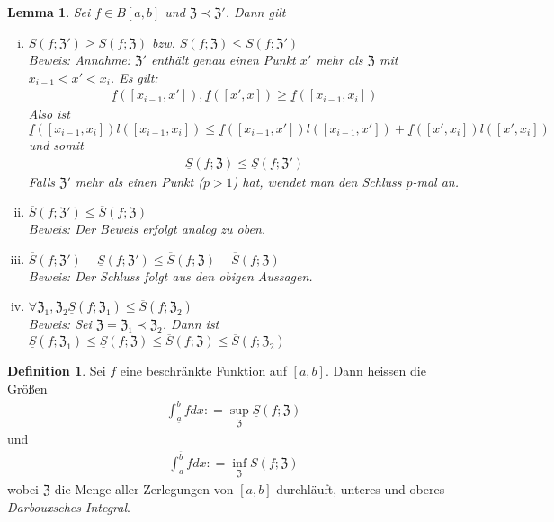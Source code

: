 \documentclass[ngerman,titlepage,twoside, parskip=half*]{scrreprt}
\newcommand*{\ZZ}{\mathfrak{Z}}
\theoremstyle{plain}
\newtheorem{lemma}{Lemma}
\theoremstyle{definition}
\newtheorem{definition}{Definition}
\theoremstyle{remark}
\newcommand*{\coloneqq}{\mathrel{\mathop:}=}
\begin{document}
\begin{lemma}
  \label{lemma:int}
  Sei $f\in B[a,b]$ und $\ZZ\prec \ZZ'$. Dann gilt
  \begin{enumerate}[(i)]
    \item $\underline{S}(f;\ZZ')\geq \underline{S}(f;\ZZ)$
      bzw. $\underline{S}(f;\ZZ) \leq \underline{S}(f; \ZZ')$\\
      \textit{Beweis}: Annahme: $\ZZ'$ enthält genau einen Punkt $x'$ mehr
      als $\ZZ$ mit $x_{i-1}<x'<x_i$. Es gilt:
      \begin{gather*}\underline{f}([x_{i-1},x']),\underline{f}([x',x])\geq \underline{f}
      ([x_{i-1},x_i])\end{gather*}
      Also ist $\underline{f}([x_{i-1},x_i])l([x_{i-1},x_i])\leq 
      \underline{f}([x_{i-1},x'])l([x_{i-1},x'])+\underline{f}([x',x_i])
      l([x',x_i])$ und somit
      \begin{gather*}\underline{S}(f;\ZZ)\leq \underline{S}(f;\ZZ')\end{gather*}
      Falls $\ZZ'$ mehr als einen Punkt ($p>1$) hat, wendet man den Schluss
      $p$-mal an.
    \item $\overline{S}(f;\ZZ')\leq \overline{S}(f;\ZZ)$\\
      \textit{Beweis}: Der Beweis erfolgt analog zu oben.
    \item $\overline{S}(f;\ZZ')-\underline{S}(f;\ZZ')\leq \overline{S}(f;\ZZ)
      -\overline{S}(f;\ZZ)$\\
      \textit{Beweis}: Der Schluss folgt aus den obigen Aussagen.
    \item $\forall \ZZ_1,\ZZ_2 \underline{S}(f;\ZZ_1)\leq \overline{S}
      (f;\ZZ_2)$\\
      \textit{Beweis}: Sei $\ZZ=\ZZ_1\prec \ZZ_2$. Dann ist $\underline{S}
      (f;\ZZ_1)\leq \underline{S}(f;\ZZ)\leq \overline{S}(f;\ZZ)\leq
      \overline{S}(f;\ZZ_2)$
  \end{enumerate}
\end{lemma}

\begin{definition}
  Sei $f$ eine beschränkte Funktion auf $[a,b]$. Dann heissen die Größen
  \begin{gather*}\int_{\underline{a}}^b fdx \coloneqq \sup_\ZZ \underline{S}(f;\ZZ)\end{gather*}
  und
  \begin{gather*}\int_a^{\overline{b}} fdx \coloneqq \inf_\ZZ \overline{S}(f;\ZZ)\end{gather*}
  wobei $\ZZ$ die Menge aller Zerlegungen von $[a,b]$ durchläuft, unteres
  und oberes \emph{Darbouxsches Integral}.
\end{definition}
\end{document}
